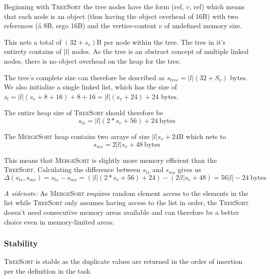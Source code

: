 \documentclass[a4paper,11pt]{article}
\begin{document}
Beginning with \textsc{TreeSort} the tree nodes have the form (ref, $v$, ref) which means that each node is an object (thus having the object overhead of 16B) with two references (á 8B, ergo 16B) and the vertice-content $v$ of undefined memory size.

This nets a total of $(32 + s_v)$B per node within the tree. The tree in it's entirety contains of $|l|$ nodes. As the tree is an abstract concept of multiple linked nodes, there is no object overhead on the heap for the tree.

The tree's complete size can therefore be described as $s_{tree} = |l|(32 + S_v)$ bytes. We also initialize a single linked list, which has the size of $s_{l} = |l|(s_v + 8 + 16) + 8 + 16 = |l|(s_v + 24) + 24$ bytes.

The entire heap size of \textsc{TreeSort} should therefore be $$s_{ts} = |l|(2*s_v + 56) + 24\ \textrm{bytes}$$

The \textsc{MergeSort} heap contains two arrays of size $|l|s_v + 24$B which nets to $$s_{ms} = 2|l|s_v + 48\ \textrm{bytes}$$

This means that \textsc{MergeSort} is slightly more memory efficient than the \textsc{TreeSort}. Calculating the difference between $s_{ts}$ and $s_{ms}$ gives us $$\Delta(s_{ts}, s_{ms}) = s_{ts} - s_{ms} = (|l|(2 * s_v + 56) + 24) - (2|l|s_v + 48) = 56|l| - 24\ \textrm{bytes}$$

\textit{A sidenote:} As \textsc{MergeSort} requires random element access to the elements in the list while \textsc{TreeSort} only assumes having access to the list in order, the \textsc{TreeSort} doesn't need consecutive memory areas available and can therefore be a better choice even in memory-limited areas.

\subsubsection{Stability}
\textsc{TreeSort} is stable as the duplicate values are returned in the order of insertion per the definition in the task.
\end{document}
